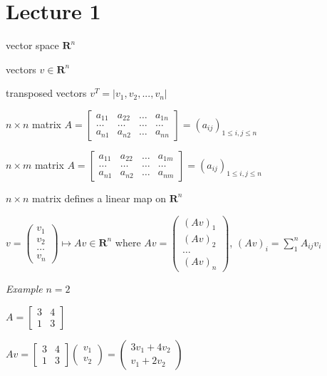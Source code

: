 \documentclass[
  12pt,
]{article}
\author{}
\date{}
\begin{document}
\chapter{Lecture 1}\label{lecture-1}

vector space \(\mathbf{R}^n\)

vectors \(v\in \mathbf{R}^n\)

transposed vectors \(v^T=|v_1, v_2, ..., v_n|\)

\(n\times n\) matrix \(A = \begin{bmatrix} a_{11} & a_{22} & … & a_{1n} \\ … & … & … & … \\ a_{n1} & a_{n2} & … & a_{nn} \end{bmatrix} = (a_{ij})_{1\leq i,j \leq n}\)

\(n \times m\) matrix \(A = \begin{bmatrix} a_{11} & a_{22} & … & a_{1m} \\ … & … & … & … \\ a_{n1} & a_{n2} & … & a_{nm} \end{bmatrix} = (a_{ij})_{1\leq i,j \leq n}\)

\(n\times n\) matrix defines a linear map on \(\mathbf{R}^n\)

\(v = \begin{pmatrix} v_1 \\ v_2 \\ … \\ v_n\end{pmatrix} \mapsto Av \in \mathbf{R}^n\) where \(Av = \begin{pmatrix} (Av)_1 \\ (Av)_2 \\ … \\ (Av)_n \end{pmatrix}\), \((Av)_i = \sum^n_{1} A_{ij}v_i\)

\emph{Example} \(n = 2\)

\(A = \begin{bmatrix} 3 & 4 \\ 1 & 3 \end{bmatrix}\)

\(Av = \begin{bmatrix} 3 & 4 \\ 1 & 3\end{bmatrix} \begin{pmatrix} v_1 \\ v_2 \end{pmatrix} = \begin{pmatrix} 3v_1 + 4v_2 \\ v_1 + 2v_2 \end{pmatrix}\)
\end{document}
